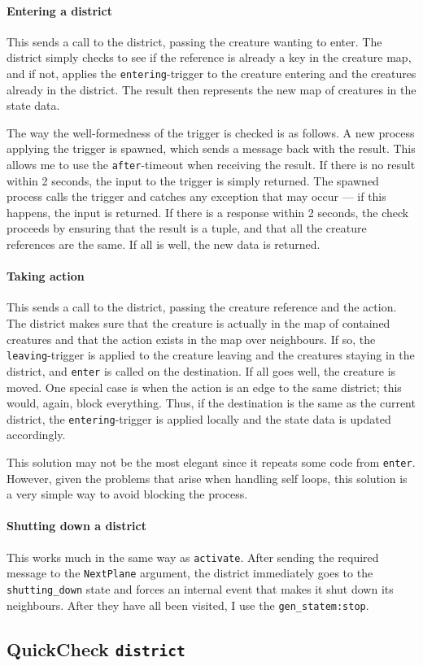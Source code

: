 \paragraph{Entering a district} This sends a call to the district, passing the creature wanting to enter. The district simply checks to see if the reference is already a key in the creature map, and if not, applies the \texttt{entering}-trigger to the creature entering and the creatures already in the district. The result then represents the  new map of creatures in the state data.

The way the well-formedness of the trigger is checked is as follows. A new process applying the trigger is spawned, which sends a message back with the result. This allows me to use the \texttt{after}-timeout when receiving the result. If there is no result within 2 seconds, the input to the trigger is simply returned. The spawned process calls the trigger and catches any exception that may occur --- if this happens, the input is returned. If there is a response within 2 seconds, the check proceeds by ensuring that the result is a tuple, and that all the creature references are the same. If all is well, the new data is returned.

\paragraph{Taking action} This sends a call to the district, passing the creature reference and the action. The district makes sure that the creature is actually in the map of contained creatures and that the action exists in the map over neighbours. If so, the \texttt{leaving}-trigger is applied to the creature leaving and the creatures staying in the district, and \texttt{enter} is called on the destination. If all goes well, the creature is moved. One special case is when the action is an edge to the same district; this would, again, block everything. Thus, if the destination is the same as the current district, the \texttt{entering}-trigger is applied locally and the state data is updated accordingly.

This solution may not be the most elegant since it repeats some code from \texttt{enter}. However, given the problems that arise when handling self loops, this solution is a very simple way to avoid blocking the process.

\paragraph{Shutting down a district} This works much in the same way as \texttt{activate}. After sending the required message to the \texttt{NextPlane} argument, the district immediately goes to the \texttt{shutting\_down} state and forces an internal event that makes it shut down its neighbours. After they have all been visited, I use the \texttt{gen\_statem:stop}.


\subsection*{QuickCheck \texttt{district}}
